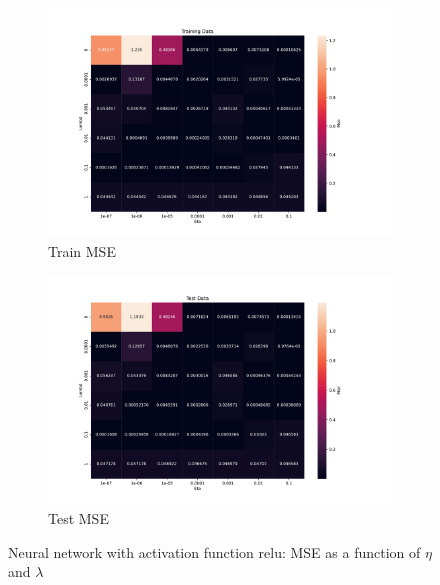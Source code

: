 \begin{figure}[htpb]
\begin{subfigure}{.5\textwidth}
  \centering
  \includegraphics[width=1.2\linewidth]{Figures/PartB/train_relu_MSE(eta,lmb)}
  \caption{Train MSE}
  \label{fig:train_relu_MSE-eta-lmb-}
\end{subfigure}%
\begin{subfigure}{.5\textwidth}
  \centering
  \includegraphics[width=1.2\linewidth]{Figures/PartB/test_relu_MSE(eta,lmb)}
  \caption{Test MSE}
  \label{fig:test_relu_MSE-eta-lmb-}
\end{subfigure}
\caption{Neural network with activation function relu: MSE as a function of \(\eta \) and \(\lambda \) }
\label{fig:relu_MSE}
\end{figure}

